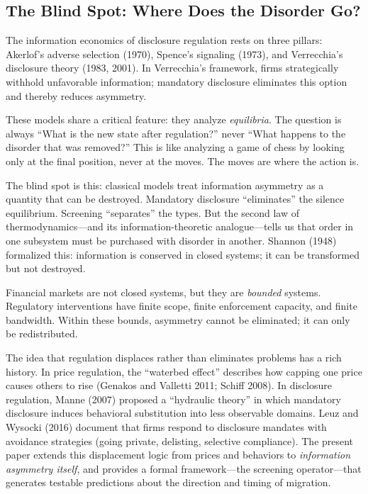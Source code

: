 \documentclass[12pt,a4paper]{article}
\begin{document}
\subsection{The Blind Spot: Where Does the Disorder Go?}

The information economics of disclosure regulation rests on three pillars: Akerlof's adverse selection (1970), Spence's signaling (1973), and Verrecchia's disclosure theory (1983, 2001). In Verrecchia's framework, firms strategically withhold unfavorable information; mandatory disclosure eliminates this option and thereby reduces asymmetry.

These models share a critical feature: they analyze \textit{equilibria}. The question is always ``What is the new state after regulation?'' never ``What happens to the disorder that was removed?'' This is like analyzing a game of chess by looking only at the final position, never at the moves. The moves are where the action is.

The blind spot is this: classical models treat information asymmetry as a quantity that can be destroyed. Mandatory disclosure ``eliminates'' the silence equilibrium. Screening ``separates'' the types. But the second law of thermodynamics---and its information-theoretic analogue---tells us that order in one subsystem must be purchased with disorder in another. Shannon (1948) formalized this: information is conserved in closed systems; it can be transformed but not destroyed.

Financial markets are not closed systems, but they are \textit{bounded} systems. Regulatory interventions have finite scope, finite enforcement capacity, and finite bandwidth. Within these bounds, asymmetry cannot be eliminated; it can only be redistributed.

The idea that regulation displaces rather than eliminates problems has a rich history. In price regulation, the ``waterbed effect'' describes how capping one price causes others to rise (Genakos and Valletti 2011; Schiff 2008). In disclosure regulation, Manne (2007) proposed a ``hydraulic theory'' in which mandatory disclosure induces behavioral substitution into less observable domains. Leuz and Wysocki (2016) document that firms respond to disclosure mandates with avoidance strategies (going private, delisting, selective compliance). The present paper extends this displacement logic from prices and behaviors to \textit{information asymmetry itself}, and provides a formal framework---the screening operator---that generates testable predictions about the direction and timing of migration.
\end{document}
